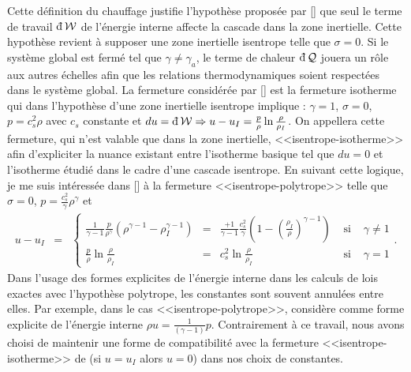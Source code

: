 Cette définition du chauffage justifie l'hypothèse proposée par [\cite{galtier_exact_2011}] que seul le terme de travail $\dj \mathcal{W}$ de l'énergie interne affecte la cascade dans la zone inertielle. Cette hypothèse revient à supposer une zone inertielle isentrope telle que $\sigma = 0$. Si le système global est fermé tel que $\gamma \neq \gamma_a$, le terme de chaleur $\dj \mathcal{Q}$ jouera un rôle aux autres échelles afin que les relations thermodynamiques soient respectées dans le système global. La fermeture considérée par [\cite{galtier_exact_2011}] est la fermeture isotherme qui dans l'hypothèse d'une zone inertielle isentrope implique :  $\gamma = 1$, $\sigma = 0$, $p = c^2_s \rho$ avec $c_s$ constante et $du = \dj \mathcal{W} \Rightarrow u-u_I = \frac{p}{\rho} \ln \frac{\rho}{\rho_I} $. On appellera cette fermeture, qui n'est valable que dans la zone inertielle, <<isentrope-isotherme>> afin d'expliciter la nuance existant entre l'isotherme basique tel que $du = 0$ et l'isotherme étudié dans le cadre d'une cascade isentrope. En suivant cette logique, je me suis intéressée dans [\cite{simon_general_2021}] à la fermeture <<isentrope-polytrope>> telle que $\sigma = 0$,  $p = \frac{c_s^2}{\gamma} \rho^{\gamma}$ et 
\begin{eqnarray}
\label{eq:thermo_ipol_u} u - u_I &=& \left\{ \begin{array}{lclcl} \frac{1 }{\gamma-1} \frac{p}{\rho^{\gamma}} \left(\rho^{\gamma-1} - \rho_I^{\gamma-1}\right) &=& \frac{+1 }{\gamma-1} \frac{c_s^2}{\gamma} \left(1 - \left(\frac{\rho_I}{\rho}\right)^{\gamma-1}\right)  & \textrm{ si } & \gamma \neq 1\\
    \frac{p}{\rho} \ln \frac{\rho}{\rho_I} &=&  c_s^2 \ln \frac{\rho}{\rho_I} &\textrm{ si }&  \gamma = 1 
   \end{array} \right. .
\end{eqnarray} 
Dans l'usage des formes explicites de l'énergie interne dans les calculs de lois exactes avec l'hypothèse polytrope, les constantes sont souvent annulées entre elles. Par exemple, dans le cas <<isentrope-polytrope>>, \cite{banerjee_kolmogorov-like_2014} considère comme forme explicite de l'énergie interne $ \rho u = \frac{1}{\left(\gamma-1\right)} p $. Contrairement à ce travail, nous avons choisi de maintenir une forme de compatibilité avec la fermeture <<isentrope-isotherme>> de \cite{galtier_exact_2011} (si $u = u_I$ alors $u = 0$) dans nos choix de constantes.

